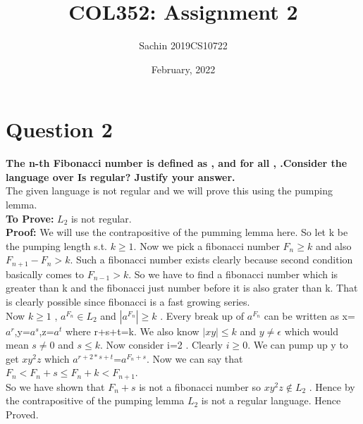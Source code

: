 \documentclass{article}
\title{COL352: Assignment 2}
\author{Sachin 2019CS10722 }
\date{February, 2022}
\begin{document}
\maketitle
\section{Question 2}
\textbf{The n-th Fibonacci number is defined as , and for all ,  .Consider the language over  Is  regular? Justify your answer.}\\
\newline
The given language is not regular and we will prove this using the pumping lemma. \\
\textbf{To Prove:} $L_2$ is not regular.\\
\textbf{Proof:} We will use the contrapositive of the pumming lemma here. So let k be the pumping length s.t. $k\geq 1$. Now we pick a fibonacci number $F_n\geq k$ and also $F_{n+1}-F_{n}>k$. Such a fibonacci number exists clearly because second condition basically comes to $F_{n-1}>k$. So we have to find a fibonacci number which is greater than k and the fibonacci just number before it is also grater than k. That is clearly possible since fibonacci is a fast growing series.\\
Now  $k\geq 1$ , $a^{F_n}\in L_2$ and $|a^{F_n}|\geq k$ . Every break up of $a^{F_n}$ can be written as x=$a^r$,y=$a^s$,z=$a^t$ where r+s+t=k. We also know $|xy|\leq k$ and $y\neq \epsilon$ which would mean $s\neq0$ and $s\leq k$. Now consider i=2 . Clearly  $i\geq0$.
We can pump up y to get $xy^2z$ which $a^{r+2*s+t}$=$a^{F_n+s}$. Now we can say that $F_n<F_n+s\leq F_n+k<F_{n+1}$.\\
So we have shown that $F_n+s$ is not a fibonacci number so $xy^2z\notin L_2$ . Hence by the contrapositive of the pumping lemma $L_2$ is not a regular language. Hence Proved.


\pagebreak
\end{document}
